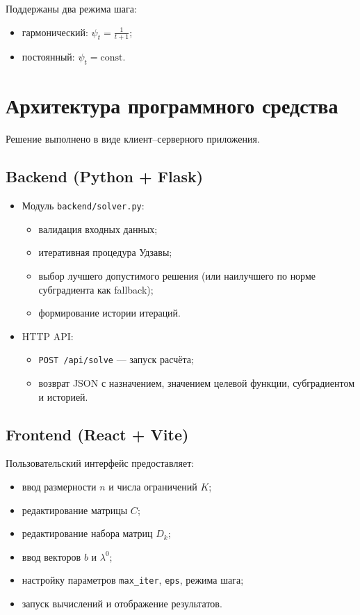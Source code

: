 \documentclass[12pt,a4paper]{article}
\begin{document}
Поддержаны два режима шага:
\begin{itemize}
  \item гармонический: $\psi_t=\frac{1}{t+1}$;
  \item постоянный: $\psi_t=\text{const}$.
\end{itemize}

\section{Архитектура программного средства}
Решение выполнено в виде клиент--серверного приложения.

\subsection{Backend (Python + Flask)}
\begin{itemize}
  \item Модуль \texttt{backend/solver.py}:
  \begin{itemize}
    \item валидация входных данных;
    \item итеративная процедура Удзавы;
    \item выбор лучшего допустимого решения (или наилучшего по норме субградиента как fallback);
    \item формирование истории итераций.
  \end{itemize}
  \item HTTP API:
  \begin{itemize}
    \item \texttt{POST /api/solve} --- запуск расчёта;
    \item возврат JSON с назначением, значением целевой функции, субградиентом и историей.
  \end{itemize}
\end{itemize}

\subsection{Frontend (React + Vite)}
Пользовательский интерфейс предоставляет:
\begin{itemize}
  \item ввод размерности $n$ и числа ограничений $K$;
  \item редактирование матрицы $C$;
  \item редактирование набора матриц $D_k$;
  \item ввод векторов $b$ и $\lambda^0$;
  \item настройку параметров \texttt{max\_iter}, \texttt{eps}, режима шага;
  \item запуск вычислений и отображение результатов.
\end{itemize}
\end{document}
